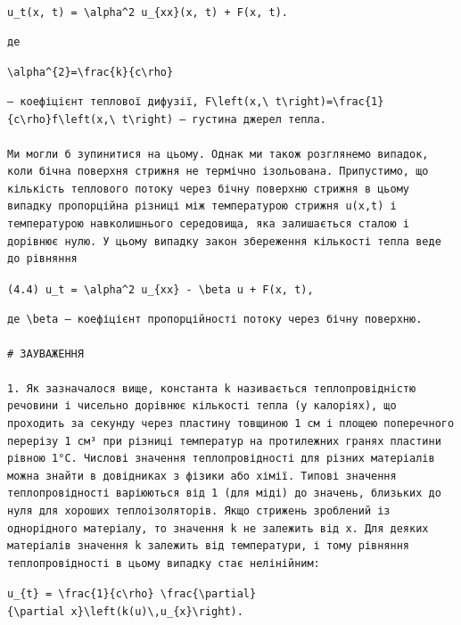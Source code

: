 \documentclass[
  ukrainian,
]{article}
\begin{document}
\texttt{u\_t(x,\ t)\ =\ \textbackslash{}alpha\^{}2\ u\_\{xx\}(x,\ t)\ +\ F(x,\ t).}

\begin{verbatim}
де
\end{verbatim}

\texttt{\textbackslash{}alpha\^{}\{2\}=\textbackslash{}frac\{k\}\{c\textbackslash{}rho\}}

\begin{verbatim}
— коефіцієнт теплової дифузії, F\left(x,\ t\right)=\frac{1}{c\rho}f\left(x,\ t\right) — густина джерел тепла.

Ми могли б зупинитися на цьому. Однак ми також розглянемо випадок, коли бічна поверхня стрижня не термічно ізольована. Припустимо, що кількість теплового потоку через бічну поверхню стрижня в цьому випадку пропорційна різниці між температурою стрижня u(x,t) і температурою навколишнього середовища, яка залишається сталою і дорівнює нулю. У цьому випадку закон збереження кількості тепла веде до рівняння
\end{verbatim}

\texttt{(4.4)\ u\_t\ =\ \textbackslash{}alpha\^{}2\ u\_\{xx\}\ -\ \textbackslash{}beta\ u\ +\ F(x,\ t),}

\begin{verbatim}
де \beta — коефіцієнт пропорційності потоку через бічну поверхню.

# ЗАУВАЖЕННЯ

1. Як зазначалося вище, константа k називається теплопровідністю речовини і чисельно дорівнює кількості тепла (у калоріях), що проходить за секунду через пластину товщиною 1 см і площею поперечного перерізу 1 см³ при різниці температур на протилежних гранях пластини рівною 1°C. Числові значення теплопровідності для різних матеріалів можна знайти в довідниках з фізики або хімії. Типові значення теплопровідності варіюються від 1 (для міді) до значень, близьких до нуля для хороших теплоізоляторів. Якщо стрижень зроблений із однорідного матеріалу, то значення k не залежить від x. Для деяких матеріалів значення k залежить від температури, і тому рівняння теплопровідності в цьому випадку стає нелінійним:
\end{verbatim}

\texttt{u\_\{t\}\ =\ \textbackslash{}frac\{1\}\{c\textbackslash{}rho\}\ \textbackslash{}frac\{\textbackslash{}partial\}\{\textbackslash{}partial\ x\}\textbackslash{}left(k(u)\textbackslash{},u\_\{x\}\textbackslash{}right).}
\end{document}
